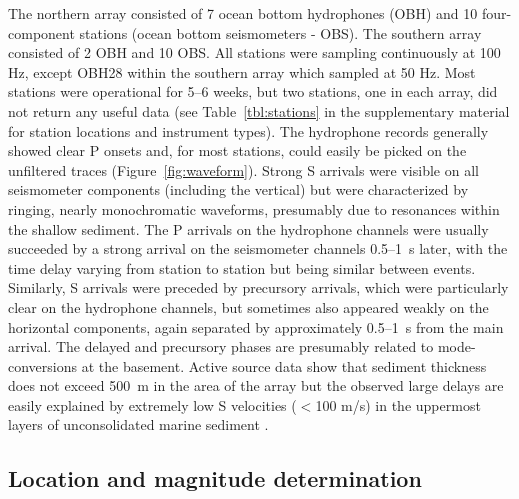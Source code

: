 \documentclass[reviewcopy]{elsart}
\begin{document}
The northern array consisted of 7 ocean bottom hydrophones (OBH) and 10 four-component stations (ocean
bottom seismometers - OBS).
   The southern array consisted of 2 OBH and 10 OBS.  All stations
   were sampling continuously at 100 Hz, except OBH28 within the
   southern array which sampled at 50 Hz. Most stations were operational for 5--6 weeks, but two
   stations, one in each array, did not return any useful data (see
   Table~\ref{tbl:stations} in the supplementary material for station locations and
   instrument types). 
   The hydrophone records generally showed clear
   P onsets and, for most stations, could easily be picked on
   the unfiltered traces (Figure~\ref{fig:waveform}). 
  Strong S arrivals were visible on all
   seismometer components (including the vertical) but were
   characterized by ringing, nearly monochromatic waveforms, presumably due to resonances within the shallow
   sediment. The P arrivals on the hydrophone channels were usually
   succeeded by a strong arrival on the seismometer channels 0.5--1~s
   later, with the time delay varying from station to station but
   being similar between events.  Similarly, S arrivals were preceded
   by precursory arrivals, which were particularly clear on the hydrophone
   channels, but sometimes also appeared weakly on the horizontal components, again
   separated by approximately 0.5--1~s from the main arrival.  The
   delayed and precursory phases are presumably related to
   mode-conversions at the basement. Active source data show that sediment
   thickness does not exceed 500~m in the area of the array
   \citep{ifmgeomar02} but the observed large delays are easily
   explained by extremely low S velocities ($<$100 m/s) in the
   uppermost layers of unconsolidated marine sediment \citep{hamilton80}. 

\subsection{Location and magnitude determination}
\end{document}
